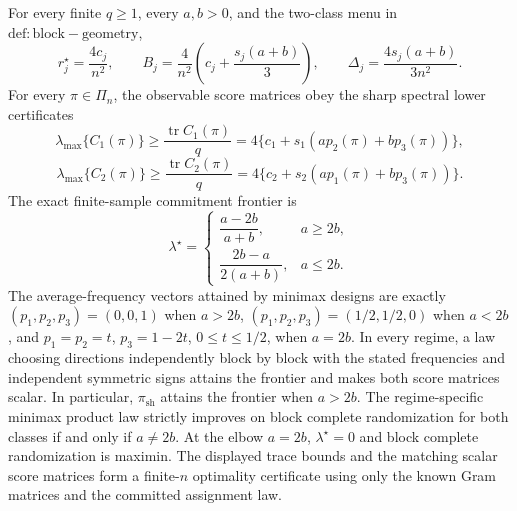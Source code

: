 For every finite \(q\ge1\), every \(a,b>0\), and the two-class menu in \(\mathrm{def:block-geometry}\),
\[
r_j^\star=\frac{4c_j}{n^2},\qquad
B_j=\frac{4}{n^2}\left(c_j+\frac{s_j(a+b)}{3}\right),\qquad
\Delta_j=\frac{4s_j(a+b)}{3n^2}.
\]
For every \(\pi\in\Pi_n\), the observable score matrices obey the sharp spectral lower certificates
\[
\lambda_{\max}\{C_1(\pi)\}\ge\frac{\operatorname{tr}C_1(\pi)}q
=4\{c_1+s_1(ap_2(\pi)+bp_3(\pi))\},
\]
\[
\lambda_{\max}\{C_2(\pi)\}\ge\frac{\operatorname{tr}C_2(\pi)}q
=4\{c_2+s_2(ap_1(\pi)+bp_3(\pi))\}.
\]
The exact finite-sample commitment frontier is
\[
\lambda^\star=
\begin{cases}
\dfrac{a-2b}{a+b},&a\ge2b,\\[6pt]
\dfrac{2b-a}{2(a+b)},&a\le2b.
\end{cases}
\]
The average-frequency vectors attained by minimax designs are exactly \((p_1,p_2,p_3)=(0,0,1)\) when \(a>2b\), \((p_1,p_2,p_3)=(1/2,1/2,0)\) when \(a<2b\), and \(p_1=p_2=t\), \(p_3=1-2t\), \(0\le t\le1/2\), when \(a=2b\). In every regime, a law choosing directions independently block by block with the stated frequencies and independent symmetric signs attains the frontier and makes both score matrices scalar. In particular, \(\pi_{\mathrm{sh}}\) attains the frontier when \(a>2b\). The regime-specific minimax product law strictly improves on block complete randomization for both classes if and only if \(a\ne2b\). At the elbow \(a=2b\), \(\lambda^\star=0\) and block complete randomization is maximin. The displayed trace bounds and the matching scalar score matrices form a finite-\(n\) optimality certificate using only the known Gram matrices and the committed assignment law.